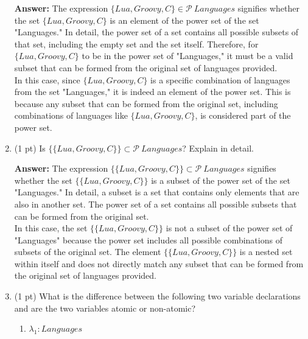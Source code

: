 \documentclass[12pt]{article}
\begin{document}
\begin{spacing}{1.5}
\begin{enumerate}
		      \textbf{Answer:} The expression $\{Lua, Groovy, C\} \in \mathcal{P} \: Languages$ signifies whether the set $\{Lua, Groovy, C\}$ is an element of the power set of the set "Languages." In detail, the power set of a set contains all possible subsets of that set, including the empty set and the set itself. Therefore, for $\{Lua, Groovy, C\}$ to be in the power set of "Languages," it must be a valid subset that can be formed from the original set of languages provided.\\
		      		      		      		                  
		      In this case, since $\{Lua, Groovy, C\}$ is a specific combination of languages from the set "Languages," it is indeed an element of the power set. This is because any subset that can be formed from the original set, including combinations of languages like $\{Lua, Groovy, C\}$, is considered part of the power set.\\
		      		      		      		                  
		\item (1 pt) Is $\{\{Lua, Groovy, C\}\} \subset \mathcal{P} \: Languages$? Explain in detail.
		      		      		      		      
		      \textbf{Answer:}  The expression $\{\{Lua, Groovy, C\}\} \subset \mathcal{P} \: Languages$ signifies whether the set $\{\{Lua, Groovy, C\}\}$ is a subset of the power set of the set "Languages." In detail, a subset is a set that contains only elements that are also in another set. The power set of a set contains all possible subsets that can be formed from the original set.\\
		      		      		      		                  
		      In this case, the set $\{\{Lua, Groovy, C\}\}$ is not a subset of the power set of "Languages" because the power set includes all possible combinations of subsets of the original set. The element $\{\{Lua, Groovy, C\}\}$ is a nested set within itself and does not directly match any subset that can be formed from the original set of languages provided.\\
		      		      		      		                  
		\item (1 pt) What is the difference between the following two variable declarations and are the two variables atomic or non-atomic?
		      		      		      		                  
		      \begin{enumerate}
		      	\item $\lambda_1 : Languages$
		      	      		      	      		      	      		      	      

\end{enumerate}
\end{enumerate}
\end{spacing}
\end{document}
